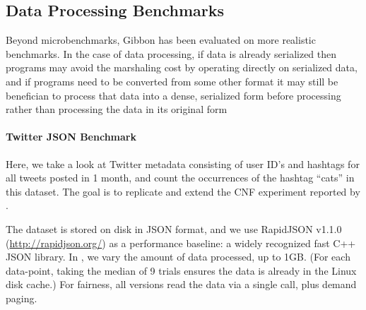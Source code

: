 \subsection{Data Processing Benchmarks}


Beyond microbenchmarks, Gibbon has been evaluated on more realistic benchmarks.
In the case of data processing, if data is already serialized then programs
may avoid the marshaling cost by operating directly on serialized data,
and if programs need to be converted from some other format it may still be
benefician to process that data into a dense, serialized form before
processing rather than processing the data in its original form

\paragraph{Twitter JSON Benchmark}

Here, we take a look at Twitter metadata consisting of user ID's and hashtags
for all tweets posted in 1 month, and count the occurrences of the hashtag
``cats'' in this dataset. The goal is to replicate and extend the CNF experiment
reported by \cite{cnf-icfp15}.

The dataset is stored on disk in JSON format, and we use RapidJSON v1.1.0
({\footnotesize\url{http://rapidjson.org/}}) as a performance baseline: a widely
recognized fast C++ JSON library.
%
In , we vary the amount of data processed,
up to 1GB. (For each data-point, taking the median of 9 trials
ensures the data is already in the Linux disk cache.)
%
For fairness, all versions read the data via a single  call, plus
demand paging.

